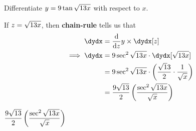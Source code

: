 



\question[3] Differentiate $y = 9 \tan\sqrt{13 x}$ with respect to $x$.

\watchout

\begin{solution}[\mcq]
  If $z=\sqrt{13 x}$, then \textbf{chain-rule} tells us that 
  \begin{align}
    \dydx &= \dfrac{\mathrm{d}}{\mathrm{d}z}y\times\dydx[z] \\
    \implies \dydx &= \va\sec^2{\sqrt{\vb x}}\cdot\dydx[\sqrt{\vb x}] \\
    &= \va\sec^2{\sqrt{\vb x}}\cdot\left( \dfrac{\sqrt\vb}{2} \cdot\dfrac{1}{\sqrt{x}}\right)\\
    &= \dfrac{\va\sqrt{\vb}}{2}\left(\dfrac{\sec^2 {\sqrt{\vb x}}}{\sqrt{x}}\right)
  \end{align}
\end{solution}

\ifprintanswers\begin{codex}
   $\dfrac{9\sqrt{13}}{2}\left(\dfrac{\sec^2 {\sqrt{13 x}}}{\sqrt{x}}\right)$
\end{codex}\fi
